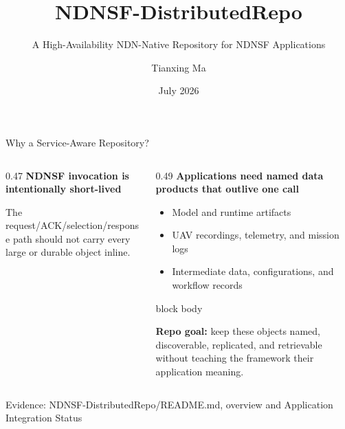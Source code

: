 \documentclass[aspectratio=169]{beamer}
\title{NDNSF-DistributedRepo}
\subtitle{A High-Availability NDN-Native Repository for NDNSF Applications}
\author{Tianxing Ma}
\institute{Department of Computer Science\\University of Memphis}
\date{July 2026}
\newcommand{\bluebox}[1]{%
  \begin{beamercolorbox}[rounded=true,shadow=false,sep=0.65em,wd=\linewidth]{block body}
  #1
  \end{beamercolorbox}
}
\newcommand{\evidence}[1]{%
  \vfill\par\noindent
  {\color{SoftGray}\tiny Evidence: #1}\par
}
\begin{document}
\begin{frame}[plain]
  \titlepage
\end{frame}

\begin{frame}{Why a Service-Aware Repository?}
\footnotesize
\begin{columns}[T]
\begin{column}{0.47\textwidth}
\textbf{NDNSF invocation is intentionally short-lived}

\vspace{0.5em}

\vspace{0.8em}
The request/ACK/selection/response path should not carry every large or durable object inline.
\end{column}
\begin{column}{0.49\textwidth}
\textbf{Applications need named data products that outlive one call}

\vspace{0.35em}
\begin{itemize}
  \item Model and runtime artifacts
  \item UAV recordings, telemetry, and mission logs
  \item Intermediate data, configurations, and workflow records
\end{itemize}

\vspace{0.35em}
\bluebox{
\textbf{Repo goal:} keep these objects named, discoverable, replicated, and retrievable without teaching the framework their application meaning.
}
\end{column}
\end{columns}
\evidence{NDNSF-DistributedRepo/README.md, overview and Application Integration Status}
\end{frame}
\end{document}
